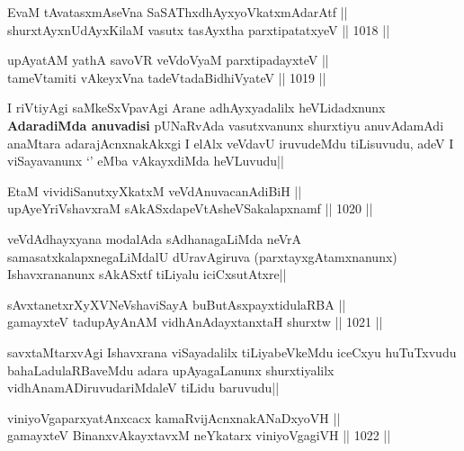 \begin{shl}
EvaM tAvatasxmAseVna SaSAThxdhAyxyoVkatxmAdarAtf || \\
shurxtAyx\s nUdAyxKilaM vasutx tasAyxtha parxtipatatxyeV ||  1018 ||  
\end{shl}
				
\begin{shl}
upAyatAM yathA savoVR veVdoV\s yaM parxtipadayxteV || \\
tameVtamiti vAkeyxVna tadeVtadaBidhiVyateV ||  1019 ||  
\end{shl}

\begin{artha}
I riVtiyAgi saMkeSxVpavAgi Arane adhAyxyadalilx heVLidadxnunx \textbf{AdaradiMda anuvadisi}
pUNaRvAda vasutxvanunx shurxtiyu anuvAdamAdi anaMtara adarajAcnxnakAkxgi I elAlx veVdavU iruvudeMdu tiLisuvudu, adeV I viSayavanunx `\stext' eMba vAkayxdiMda heVLuvudu||
\end{artha}


\begin{shl}
EtaM vividiSanutxyXkatxM veVdAnuvacanAdiBiH || \\
upAyeYriVshavxraM sAkASxdapeVtAsheVSakalapxnamf ||  1020 ||  
\end{shl}

\begin{artha}
veVdAdhayxyana modalAda sAdhanagaLiMda neVrA samasatxkalapxnegaLiMdalU dUravAgiruva (parxtayxgAtamxnanunx) Ishavxrananunx sAkASxtf tiLiyalu iciCxsutAtxre||
\end{artha}

\begin{shl}
sAvxtanetxrXyXVNeVshaviSayA buButAsx\s payxtidulaRBA || \\
gamayxteV tadupAyAnAM vidhAnAdayxtanxtaH shurxtw ||  1021 ||  
\end{shl}

\begin{artha}
savxtaMtarxvAgi Ishavxrana viSayadalilx tiLiyabeVkeMdu iceCxyu huTuTxvudu bahaLadulaRBaveMdu adara upAyagaLanunx shurxtiyalilx vidhAnamADiruvudariMdaleV tiLidu baruvudu||
\end{artha}


\begin{shl}
viniyoVgaparxyatAnxcacx kamaRvijAcnxnakANaDxyoVH || \\
gamayxteV BinanxvAkayxtavxM neYkatarx viniyoVgagiVH ||  1022 ||  
\end{shl}

